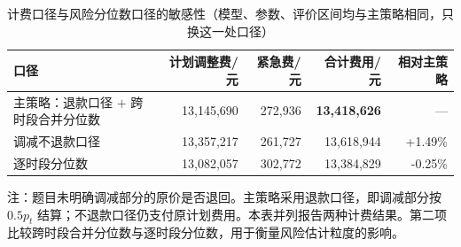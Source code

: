 \begin{table}[htbp]
  \centering
  \caption{计费口径与风险分位数口径的敏感性（模型、参数、评价区间均与主策略相同，只换这一处口径）}
  \label{tab:p3-billing}
  \small
  \begin{tabular}{lrrrr}
    \toprule
    口径 & 计划调整费/元 & 紧急费/元 & 合计费用/元 & 相对主策略 \\
    \midrule
    主策略：退款口径 $+$ 跨时段合并分位数 & 13,145,690 & 272,936 & \textbf{13,418,626} & --- \\
    调减不退款口径 & 13,357,217 & 261,727 & 13,618,944 & +1.49\% \\
    逐时段分位数 & 13,082,057 & 302,772 & 13,384,829 & -0.25\% \\
    \bottomrule
  \end{tabular}
  \par\vspace{2pt}
  \begin{minipage}{\textwidth}\footnotesize
    注：题目未明确调减部分的原价是否退回。主策略采用退款口径，即调减部分按 $0.5p_t$ 结算；不退款口径仍支付原计划费用。本表并列报告两种计费结果。第二项比较跨时段合并分位数与逐时段分位数，用于衡量风险估计粒度的影响。
  \end{minipage}
\end{table}

